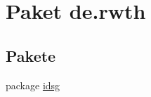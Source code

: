\hypertarget{namespacede_1_1rwth}{\section{Paket de.\-rwth}
\label{namespacede_1_1rwth}
}
\subsection*{Pakete}
\begin{DoxyCompactItemize}
\item 
package \hyperlink{namespacede_1_1rwth_1_1idsg}{idsg}
\end{DoxyCompactItemize}
